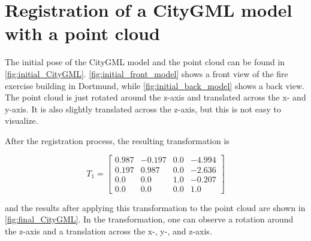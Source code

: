     \section{Registration of a CityGML model with a point cloud}
        The initial pose of the CityGML model and the point cloud can be found in \autoref{fig:initial_CityGML}.
        \autoref{fig:initial_front_model} shows a front view of the fire exercise building in Dortmund, while \autoref{fig:initial_back_model} shows a back view.
        The point cloud is just rotated around the z-axis and translated across the x- and y-axis.
        It is also slightly translated across the z-axis, but this is not easy to visualize.

        After the registration process, the resulting transformation is

        \begin{equation*}
            T_1 = 
            \begin{bmatrix}0.987 & -0.197 & 0.0 & -4.994 \\ 
                0.197 & 0.987 & 0.0 & -2.636 \\
                0.0 & 0.0 & 1.0 & -0.207 \\
                0.0 & 0.0 & 0.0 & 1.0
            \end{bmatrix}
        \end{equation*}

        and the results after applying this transformation to the point cloud are shown in \autoref{fig:final_CityGML}.
        In the transformation, one can observe a rotation around the z-axis and a translation across the x-, y-, and z-axis.

